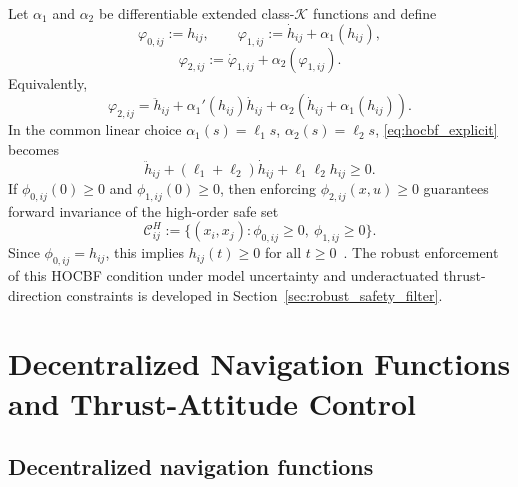 \documentclass[journal,twoside,web]{ieeecolor}
\begin{document}
Let $\alpha_1$ and
$\alpha_2$ be differentiable extended class-$\mathcal K$ functions and define
\begin{equation}
    \varphi_{0,ij}:=h_{ij},
    \qquad
    \varphi_{1,ij}:=\dot h_{ij}+\alpha_1(h_{ij}),
    \label{eq:hocbf_phi01}
\end{equation}
\begin{equation}
    \varphi_{2,ij}:=
    \dot\varphi_{1,ij}+\alpha_2(\varphi_{1,ij}).
    \label{eq:hocbf_phi2}
\end{equation}
Equivalently,
\begin{equation}
    \varphi_{2,ij}
    =
    \ddot h_{ij}
    +
    \alpha_1'(h_{ij})\dot h_{ij}
    +
    \alpha_2\!\left(\dot h_{ij}+\alpha_1(h_{ij})\right).
    \label{eq:hocbf_explicit}
\end{equation}
In the common linear choice
$\alpha_1(s)=\ell_1s$, $\alpha_2(s)=\ell_2s$,
\eqref{eq:hocbf_explicit} becomes
\[
    \ddot h_{ij}
    +
    (\ell_1+\ell_2)\dot h_{ij}
    +
    \ell_1\ell_2 h_{ij}
    \geq 0 .
\]
If \(\phi_{0,ij}(0)\ge0\) and \(\phi_{1,ij}(0)\ge0\), then
enforcing \(\phi_{2,ij}(x,u)\ge0\) guarantees forward invariance of the
high-order safe set
\[
\mathcal C^H_{ij}:=\{(x_i,x_j):\phi_{0,ij}\ge0,\ \phi_{1,ij}\ge0\}.
\]
Since \(\phi_{0,ij}=h_{ij}\), this implies \(h_{ij}(t)\ge0\) for all
\(t\ge0\)~\cite{NguyenACC2016,XiaoCDC2019,TanShawCortezDimarogonas2022}.
The robust enforcement of this HOCBF condition under model
uncertainty and underactuated thrust-direction constraints is
developed in Section~\ref{sec:robust_safety_filter}.

\section{Decentralized Navigation Functions and Thrust-Attitude Control}
\label{sec:navigation_control}

\subsection{Decentralized navigation functions}
\end{document}

